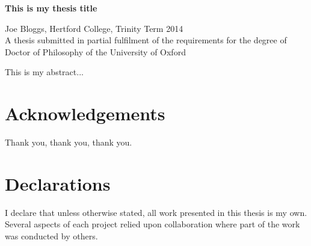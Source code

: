 \begin{center}
{{\bf This is my thesis title}} \\
%
\end{center}
\begin{center}

{Joe Bloggs, Hertford College, Trinity Term 2014}\\
{A thesis submitted in partial fulfilment of the requirements
for the degree of Doctor of Philosophy of the University of Oxford} \\
\end{center}


\noindent
This is my abstract... \\




\newpage
\chapter*{Acknowledgements}
\thispagestyle{plain}
\noindent
%
Thank you, thank you, thank you.

\newpage
\chapter*{Declarations}
\thispagestyle{plain}
\noindent
I declare that unless otherwise stated, all work presented in this thesis is my own. Several aspects of each project relied upon collaboration where part of the work was conducted by others.


